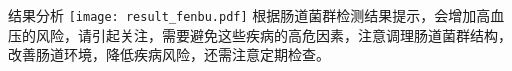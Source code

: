 \vspace*{3mm}
\begin{spacing}{1.5}
\begin{LRaside}[.8]{\fontsize{8.8pt}{11pt}\selectfont 结果分析}
\noindent
\texttt{[image: result\_fenbu.pdf]}
\asidebreak %
\fontsize{8pt}{11pt}\selectfont 根据肠道菌群检测结果提示，会增加高血压的风险，请引起关注，需要避免这些疾病的高危因素，注意调理肠道菌群结构，改善肠道环境，降低疾病风险，还需注意定期检查。

\end{LRaside}
\end{spacing}

\noindent\fontsize{7.5pt}{11pt}\selectfont {（注：本检测仅作为健康评估，不作为临床诊断，注意正常并不意味着无疾病发生的可能；高风险也不意味着一定发生此病。）}


